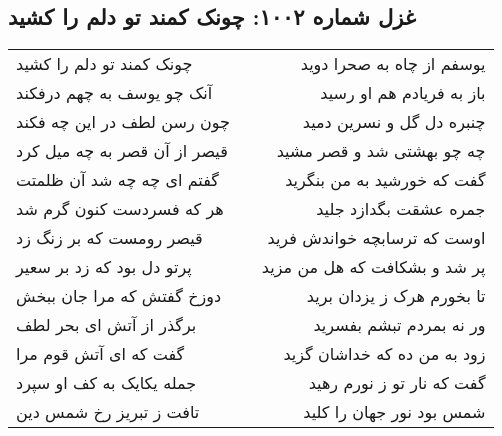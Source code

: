 \begin{center}
\section*{غزل شماره ۱۰۰۲: چونک کمند تو دلم را کشید}
\label{sec:1002}
\begin{longtable}{l p{0.5cm} r}
چونک کمند تو دلم را کشید
&&
یوسفم از چاه به صحرا دوید
\\
آنک چو یوسف به چهم درفکند
&&
باز به فریادم هم او رسید
\\
چون رسن لطف در این چه فکند
&&
چنبره دل گل و نسرین دمید
\\
قیصر از آن قصر به چه میل کرد
&&
چه چو بهشتی شد و قصر مشید
\\
گفتم ای چه چه شد آن ظلمتت
&&
گفت که خورشید به من بنگرید
\\
هر که فسردست کنون گرم شد
&&
جمره عشقت بگدازد جلید
\\
قیصر رومست که بر زنگ زد
&&
اوست که ترسابچه خواندش فرید
\\
پرتو دل بود که زد بر سعیر
&&
پر شد و بشکافت که هل من مزید
\\
دوزخ گفتش که مرا جان ببخش
&&
تا بخورم هرک ز یزدان برید
\\
برگذر از آتش ای بحر لطف
&&
ور نه بمردم تبشم بفسرید
\\
گفت که ای آتش قوم مرا
&&
زود به من ده که خداشان گزید
\\
جمله یکایک به کف او سپرد
&&
گفت که نار تو ز نورم رهید
\\
تافت ز تبریز رخ شمس دین
&&
شمس بود نور جهان را کلید
\\
\end{longtable}
\end{center}
